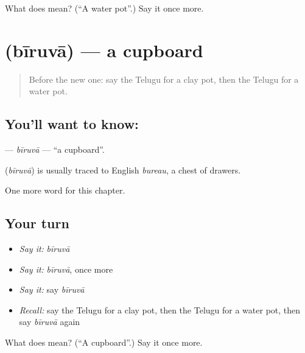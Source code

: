\begin{tcolorbox}[breakable,colback=teal!4,colframe=teal!35!black,title={Before you move on}]
What does  mean? (\textquotedblleft{}A water pot\textquotedblright{}.) Say it once more.
\end{tcolorbox}
\section[\texorpdfstring{\te{బీరువా} (bīruvā)}{బీరువా (bīruvā)}]{ (bīruvā) — a cupboard}

\label{lesson:TE-C129-biruva}



\begin{quote}
Before the new one: say the Telugu for a clay pot, then the Telugu for a water pot.
\end{quote}

\subsection*{You'll want to know: }
\textbf{} — \emph{bīruvā} — \textquotedblleft{}a cupboard\textquotedblright{}.

\begin{cousinweb}
\textbf{} (\emph{bīruvā}) is usually traced to English \emph{bureau}, a chest of drawers.
\end{cousinweb}

\begin{grammarlens}[title={What you've built}]
One more word for this chapter.
\end{grammarlens}

\subsection*{Your turn}
\begin{itemize}
\raggedright
  \item \emph{Say it:} \emph{bīruvā}
  \item \emph{Say it:} \emph{bīruvā}, once more
  \item \emph{Say it:} say \emph{bīruvā}
  \item \emph{Recall:} say the Telugu for a clay pot, then the Telugu for a water pot, then say \emph{bīruvā} again
\end{itemize}

\begin{tcolorbox}[breakable,colback=teal!4,colframe=teal!35!black,title={Before you move on}]
What does  mean? (\textquotedblleft{}A cupboard\textquotedblright{}.) Say it once more.
\end{tcolorbox}
